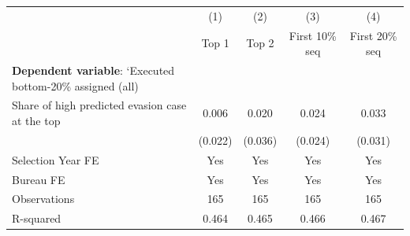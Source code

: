 {
\def\sym#1{\ifmmode^{#1}\else\(^{#1}\)\fi}
\begin{tabular}{l*{4}{c}}
\toprule
            &\multicolumn{1}{c}{(1)}&\multicolumn{1}{c}{(2)}&\multicolumn{1}{c}{(3)}&\multicolumn{1}{c}{(4)}\\
            &\multicolumn{1}{c}{Top 1}&\multicolumn{1}{c}{Top 2}&\multicolumn{1}{c}{First 10\% seq}&\multicolumn{1}{c}{First 20\% seq}\\
\midrule
\textbf{Dependent variable}: `Executed bottom-20\% \/ assigned (all)&                     &                     &                     &                     \\
\addlinespace
Share of high predicted evasion case at the top&       0.006         &       0.020         &       0.024         &       0.033         \\
            &     (0.022)         &     (0.036)         &     (0.024)         &     (0.031)         \\
\midrule
Selection Year FE&         Yes         &         Yes         &         Yes         &         Yes         \\
Bureau FE   &         Yes         &         Yes         &         Yes         &         Yes         \\
Observations&         165         &         165         &         165         &         165         \\
R-squared   &       0.464         &       0.465         &       0.466         &       0.467         \\
\bottomrule
\end{tabular}
}
